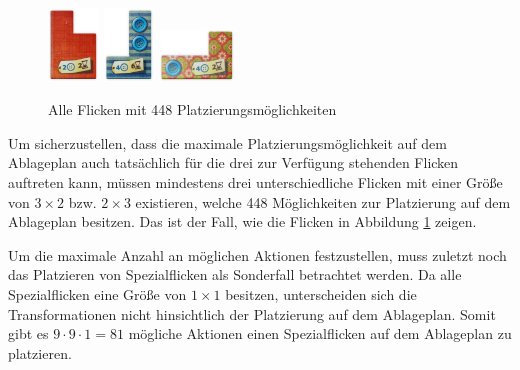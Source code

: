 \begin{figure}
    \vspace*{-0.1cm}
    \centering
    \includegraphics[width=0.12\textwidth]{res/pictures/assets/08-front.png}

    \includegraphics[width=0.12\textwidth]{res/pictures/assets/14-front.png}

    \includegraphics[width=0.18\textwidth]{res/pictures/assets/19-front.png}
    \caption[Alle Flicken mit 448 Platzierungsmöglichkeiten]{\unskip}
    Alle Flicken mit 448 Platzierungsmöglichkeiten
    \label{fig:flicken-mit-448}
    \vspace*{-0.1cm}
\end{figure}

Um sicherzustellen, dass die maximale Platzierungsmöglichkeit auf dem Ablageplan auch tatsächlich für die drei zur Verfügung stehenden Flicken auftreten kann, müssen mindestens drei unterschiedliche Flicken mit einer Größe von $3 \times 2$ bzw. $2 \times 3$ existieren, welche 448 Möglichkeiten zur Platzierung auf dem Ablageplan besitzen. Das ist der Fall, wie die Flicken in Abbildung \ref{fig:flicken-mit-448} zeigen.

Um die maximale Anzahl an möglichen Aktionen festzustellen, muss zuletzt noch das Platzieren von Spezialflicken als Sonderfall betrachtet werden. Da alle Spezialflicken eine Größe von $1 \times 1$ besitzen, unterscheiden sich die Transformationen nicht hinsichtlich der Platzierung auf dem Ablageplan. Somit gibt es $9 \cdot 9 \cdot 1 = 81$ mögliche Aktionen einen Spezialflicken auf dem Ablageplan zu platzieren.

